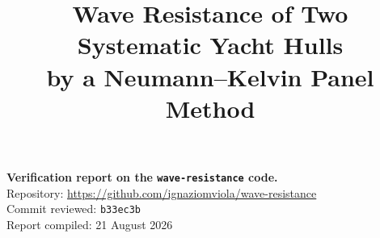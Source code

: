 \documentclass[11pt]{article}
\title{\vspace{-12mm}\bfseries Wave Resistance of Two Systematic Yacht Hulls\\
by a Neumann--Kelvin Panel Method}
\author{}
\date{}
\begin{document}
\maketitle
\vspace{-16mm}

\begin{center}
\begin{minipage}{0.9\textwidth}
\small
\textbf{Verification report on the \texttt{wave-resistance} code.}\\[2mm]
Repository: \url{https://github.com/ignaziomviola/wave-resistance}\\
Commit reviewed: \texttt{b33ec3b}\\
Report compiled: 21 August 2026
\end{minipage}
\end{center}
\end{document}
